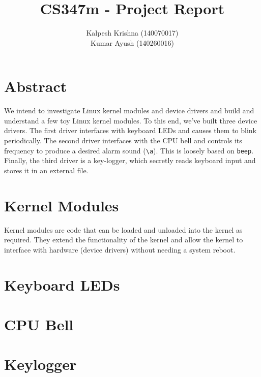 \documentclass[12pt]{article}
\title{\textbf{CS347m - Project Report}}
\author{Kalpesh Krishna (140070017)\\ Kumar Ayush (140260016)}
\date{}
\begin{document}
\maketitle
\section{Abstract}
We intend to investigate Linux kernel modules and device drivers and build and understand a few toy Linux kernel modules. To this end, we've built three device drivers. The first driver interfaces with keyboard LEDs and causes them to blink periodically. The second driver interfaces with the CPU bell and controls its frequency to produce a desired alarm sound (\texttt{\textbackslash a}). This is loosely based on \texttt{beep}. Finally, the third driver is a key-logger, which secretly reads keyboard input and stores it in an external file.
\section{Kernel Modules}
Kernel modules are code that can be loaded and unloaded into the kernel as required. They extend the functionality of the kernel and allow the kernel to interface with hardware (device drivers) without needing a system reboot. 

\section{Keyboard LEDs}
\section{CPU Bell}
\section{Keylogger}
\end{document}
